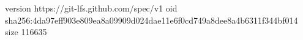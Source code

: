 version https://git-lfs.github.com/spec/v1
oid sha256:4da97eff903e809ea8a09909d024dae11e6f0cd749a8dee8a4b6311f344bf014
size 116635
